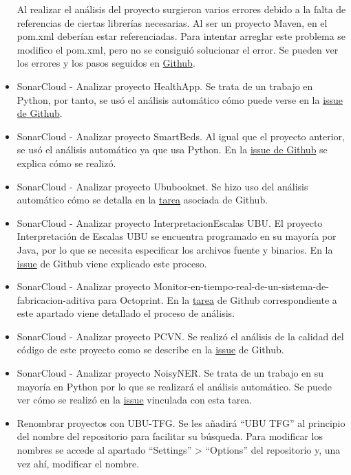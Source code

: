 \begin{itemize}
		Al realizar el análisis del proyecto surgieron varios errores debido a la falta de referencias de ciertas librerías necesarias. Al ser un proyecto Maven, en el pom.xml deberían estar referenciadas. Para intentar arreglar este problema se modifico el pom.xml, pero no se consiguió solucionar el error. Se pueden ver los errores y los pasos seguidos en \href{https://github.com/dbo1001/Gestor-TFG-2021/issues/154}{Github}.
	\item SonarCloud - Analizar proyecto HealthApp.
		Se trata de un trabajo en Python, por tanto, se usó el análisis automático cómo puede verse en la \href{https://github.com/dbo1001/Gestor-TFG-2021/issues/153}{issue de Github}.
	\item SonarCloud - Analizar proyecto SmartBeds.
		Al igual que el proyecto anterior, se usó el análisis automático ya que usa Python. En la \href{https://github.com/dbo1001/Gestor-TFG-2021/issues/148}{issue de Github} se explica cómo se realizó.
	\item SonarCloud - Analizar proyecto Ububooknet.
		Se hizo uso del análisis automático cómo se detalla en la \href{https://github.com/dbo1001/Gestor-TFG-2021/issues/159}{tarea} asociada de Github.
	\item SonarCloud - Analizar proyecto InterpretacionEscalas UBU.
		El proyecto Interpretación de Escalas UBU se encuentra programado en su mayoría por Java, por lo que se necesita especificar los archivos fuente y binarios. En la \href{https://github.com/dbo1001/Gestor-TFG-2021/issues/163}{issue} de Github viene explicado este proceso.
	\item SonarCloud - Analizar proyecto Monitor-en-tiempo-real-de-un-sistema-de-fabricacion-aditiva para Octoprint.
		En la \href{https://github.com/dbo1001/Gestor-TFG-2021/issues/164}{tarea} de Github correspondiente a este apartado viene detallado el proceso de análisis.
	\item SonarCloud - Analizar proyecto PCVN.
		Se realizó el análisis de la calidad del código de este proyecto como se describe en la \href{https://github.com/dbo1001/Gestor-TFG-2021/issues/162}{issue} de Github.
	\item SonarCloud - Analizar proyecto NoisyNER. 
		Se trata de un trabajo en su mayoría en Python por lo que se realizará el análisis automático. Se puede ver cómo se realizó en la \href{https://github.com/dbo1001/Gestor-TFG-2021/issues/160}{issue} vinculada con esta tarea.
	\item Renombrar proyectos con UBU-TFG. 
		Se les añadirá ``UBU TFG'' al principio del nombre del repositorio para facilitar su búsqueda. Para modificar los nombres se accede al apartado ``Settings'' > ``Options'' del repositorio y, una vez ahí, modificar el nombre.

\end{itemize}
